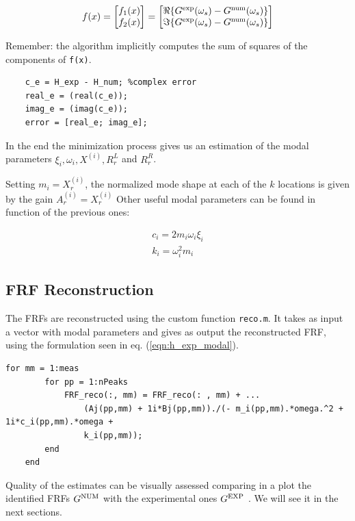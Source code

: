 \documentclass[a4paper,12pt,oneside]{article}
\begin{document}
\[
	f(x) = 
		\begin{bmatrix}
			f_1 (x) \\
			f_2 (x)
		\end{bmatrix} =		\begin{bmatrix} 
										\Re\{G^\textup{exp}(\omega_s) - G^\textup{num}(\omega_s)\} \\
										\Im\{G^\textup{exp}(\omega_s) - G^\textup{num}(\omega_s)\}  
									\end{bmatrix}
\]

Remember: the algorithm implicitly computes the sum of squares of the components of \lstinline!f(x)!.

\begin{lstlisting}[caption = {Snippet of code from \texttt{err\_i.m}}]
	% error computation
	c_e = H_exp - H_num; %complex error
	real_e = (real(c_e));
	imag_e = (imag(c_e));
	error = [real_e; imag_e];
\end{lstlisting}

In the end the minimization process gives us an estimation of the modal parameters $ \xi_i, \omega_i, X^{(i)}, R_r^L $ and $ R_r^R $.

Setting $ m_i = X_r^{(i)} $, the normalized mode shape at each of the $ k $ locations is given by the gain $ A_r^{(i)} = X_r^{(i)} $
Other useful modal parameters can be found in function of the previous ones:

\begin{gather*}
	c_i = 2 m_i \omega_i \xi_i \\
	k_i = \omega_i^2 m_i
\end{gather*}

\subsection{FRF Reconstruction}
The FRFs are reconstructed using the custom function \lstinline!reco.m!. It takes as input a vector with modal parameters and gives as output the reconstructed FRF, using the formulation seen in eq. (\ref{eqn:h_exp_modal}).

\begin{lstlisting}[caption = {Snippet of code from \texttt{reco.m}}]
	for mm = 1:meas
		for pp = 1:nPeaks
			FRF_reco(:, mm) = FRF_reco(: , mm) + ...
				(Aj(pp,mm) + 1i*Bj(pp,mm))./(- m_i(pp,mm).*omega.^2 + 1i*c_i(pp,mm).*omega +
				k_i(pp,mm));
		end
	end
\end{lstlisting}

Quality of the estimates can be visually assessed comparing in a plot the
identified FRFs $ G^\textup{NUM} $ with the experimental ones $ G^\textup{EXP} $ . We will see it in the next sections.
\end{document}
